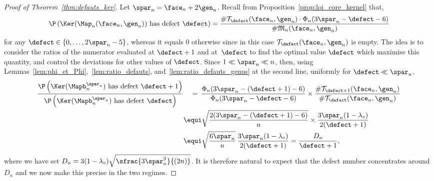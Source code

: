 \begin{proof}[Proof of Theorem~\ref{thm:defauts_ker}]
Let $\spar_n = \face_n+2\gen_n$.
Recall from Proposition~\ref{prop:loi_core_kernel} that,
\[
\P\left(\Ker(\Map_n(\face_n,\gen_n)) \textrm{ has defect } \defect\right)
= \frac{\# \mathcal{T}_\defect(\face_n,\gen_n) \cdot \Phi_{n}(3\spar_n-\defect-6 )}{\# \mathfrak{M}_n(\face_n,\gen_n)}
\]
for any $\defect \in\{0, \dots, 2\spar_n-5\}$, whereas it equals $0$ otherwise since in this case $\mathcal{T}_\defect(\face_n,\gen_n)$ is empty.
The idea is to consider the ratios of the numerator evaluated at $\defect+1$ and at~$\defect$ to find the optimal value $\defect$ which maximise this quantity, and control the deviations for other values of $\defect$.
Since $ 1 \ll \spar_{n} \ll n$, then, using Lemmas~\ref{lem:phi_et_Phi},~\ref{lem:ratio_defauts}, and~\ref{lem:ratio_defauts_genus} at the second line, uniformly for $ \defect \ll \spar_{n}$,
\begin{align}
\frac{\P\left(\Ker(\Mapb_n^{\spar_n}) \textrm{ has defect } \defect+1\right)}{\P\left(\Ker(\Mapb_n^{\spar_n}) \textrm{ has defect } \defect\right)}
&\quad=\, \frac{\Phi_{n}(3\spar_n-(\defect+1)-6 )}{\Phi_{n}(3\spar_n-\defect-6 )} \times \frac{ \# \mathcal{T}_{ \defect +1}(\face_n,\gen_n)}{{ \# \mathcal{T}_{ \defect}(\face_n,\gen_n)}}
\notag\\
&\equi \sqrt{\frac{2(3\spar_n - (\defect+1) - 6)}{n}} \times \frac{3 \spar_n(1-\lambda_{\circ})}{2 (\defect+1)}
\notag\\
&\equi \sqrt{\frac{6\spar_n}{n}}\, \frac{3 \spar_n(1-\lambda_{\circ})}{2 (\defect+1)}
= \frac{D_n}{\defect+1}, \label{eq:ratio_estimee}
\end{align}
where we have set $D_n = 3 (1-\lambda_{\circ}) \sqrt{\sfrac{3\spar_n^3}{(2n)}}$. It is therefore natural to expect that the defect number concentrates around $D_n$ and we now make this precise in the two regimes.


\end{proof}
